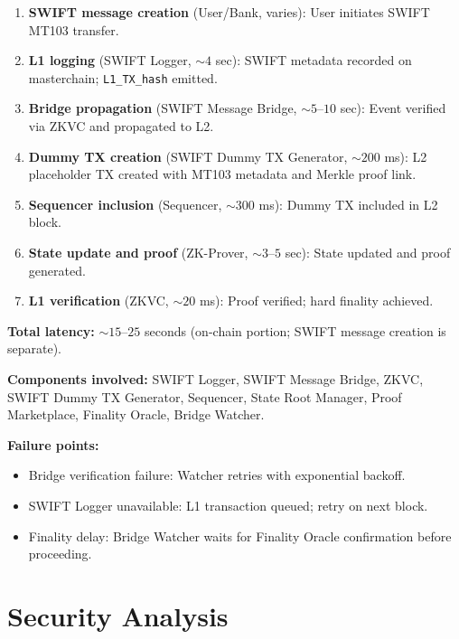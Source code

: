 \documentclass[12pt,a4paper]{article}
\theoremstyle{definition}
\theoremstyle{remark}
\begin{document}
\begin{enumerate}[nosep]
    \item \textbf{SWIFT message creation} (User/Bank, varies): User initiates SWIFT MT103 transfer.
    \item \textbf{L1 logging} (SWIFT Logger, ${\sim}4$ sec): SWIFT metadata recorded on masterchain; \texttt{L1\_TX\_hash} emitted.
    \item \textbf{Bridge propagation} (SWIFT Message Bridge, ${\sim}5$--$10$ sec): Event verified via ZKVC and propagated to L2.
    \item \textbf{Dummy TX creation} (SWIFT Dummy TX Generator, ${\sim}200$ ms): L2 placeholder TX created with MT103 metadata and Merkle proof link.
    \item \textbf{Sequencer inclusion} (Sequencer, ${\sim}300$ ms): Dummy TX included in L2 block.
    \item \textbf{State update and proof} (ZK-Prover, ${\sim}3$--$5$ sec): State updated and proof generated.
    \item \textbf{L1 verification} (ZKVC, ${\sim}20$ ms): Proof verified; hard finality achieved.
\end{enumerate}

\textbf{Total latency:} ${\sim}15$--$25$ seconds (on-chain portion; SWIFT message creation is separate).

\textbf{Components involved:} SWIFT Logger, SWIFT Message Bridge, ZKVC, SWIFT Dummy TX Generator, Sequencer, State Root Manager, Proof Marketplace, Finality Oracle, Bridge Watcher.

\textbf{Failure points:}
\begin{itemize}[nosep]
    \item Bridge verification failure: Watcher retries with exponential backoff.
    \item SWIFT Logger unavailable: L1 transaction queued; retry on next block.
    \item Finality delay: Bridge Watcher waits for Finality Oracle confirmation before proceeding.
\end{itemize}


\section{Security Analysis}
\label{sec:security-analysis}
\end{document}
